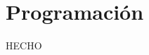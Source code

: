 \documentclass[11pt,fleqn]{book} %
\begin{document}
%
%


\part{Programación}
\label{Programación}

HECHO

%
%





%
%







\end{document}
